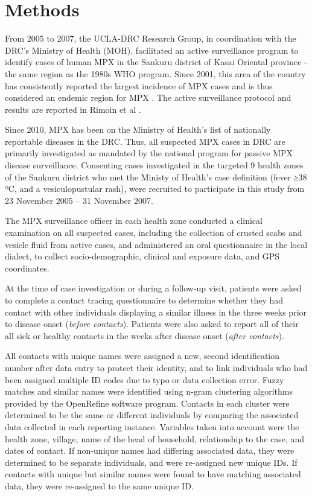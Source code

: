 \section{Methods}

From 2005 to 2007, the UCLA-DRC Research Group, in coordination with the DRC’s Ministry of Health (MOH), facilitated an active surveillance program to identify cases of human MPX in the Sankuru district of Kasai Oriental province - the same region as the 1980s WHO program. Since 2001, this area of the country has consistently reported the largest incidence of MPX cases and is thus considered an endemic region for MPX \cite{Rimoin2010}. The active surveillance protocol and results are reported in Rimoin et al \cite{Rimoin2010}.

Since 2010, MPX has been on the Ministry of Health's list of nationally reportable diseases in the DRC. Thus, all suspected MPX cases in DRC are primarily investigated as mandated by the national program for passive MPX disease surveillance. Consenting cases investigated in the targeted 9 health zones of the Sankuru district who met the  Ministy of Health’s case definition (fever ≥38 ºC, and a vesiculopustular rash), were recruited to participate in this study from 23 November 2005 – 31 November 2007. 

The MPX surveillance officer in each health zone conducted a clinical examination on all suspected cases, including the collection of crusted scabs and vesicle fluid from active cases, and administered an oral questionnaire in the local dialect, to collect socio-demographic, clinical and exposure data, and GPS coordinates.


At the time of case investigation or during a follow-up visit, patients were asked to complete a contact tracing questionnaire to determine whether they had contact with other individuals displaying a similar illness in the three weeks prior to disease onset  (\textit{before contacts}). Patients were also asked to report all of their all sick or healthy contacts in the weeks after disease onset (\textit{after contacts}).

All contacts with unique names were assigned a new, second identification number after data entry to protect their identity, and to link individuals who had been assigned multiple ID codes due to typo or data collection error. Fuzzy matches and similar names were identified using n-gram clustering algorithms provided by the OpenRefine software program. Contacts in each cluster were determined to be the same or different individuals by comparing the associated data collected in each reporting instance. Variables taken into account were the health zone, village, name of the head of household, relationship to the case, and dates of contact. If non-unique names had differing associated data, they were determined to be separate individuals, and were re-assigned new unique IDs. If contacts with unique but similar names were found to have matching associated data, they were re-assigned to the same unique ID.

